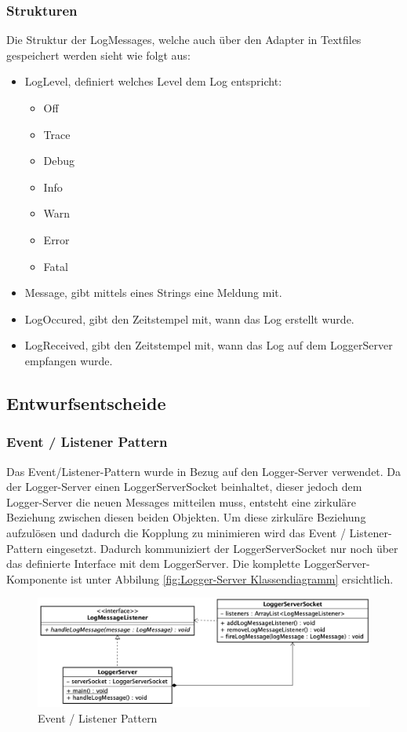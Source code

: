 \subsubsection{Strukturen}
Die Struktur der LogMessages, welche auch über den Adapter in Textfiles gespeichert werden sieht wie folgt aus:
\begin{itemize}
	\item LogLevel, definiert welches Level dem Log entspricht:
	\begin{itemize}
		\item Off
		\item Trace
		\item Debug
		\item Info
		\item Warn
		\item Error
		\item Fatal
	\end{itemize}
	\item Message, gibt mittels eines Strings eine Meldung mit.
	\item LogOccured, gibt den Zeitstempel mit, wann das Log erstellt wurde.
	\item LogReceived, gibt den Zeitstempel mit, wann das Log auf dem LoggerServer empfangen wurde.
\end{itemize}

\newpage
\subsection{Entwurfsentscheide}
\subsubsection{Event / Listener Pattern}
Das Event/Listener-Pattern wurde in Bezug auf den Logger-Server verwendet. Da der Logger-Server einen LoggerServerSocket beinhaltet, dieser jedoch dem Logger-Server die neuen Messages mitteilen muss, entsteht eine zirkuläre Beziehung zwischen diesen beiden Objekten. 
Um diese zirkuläre Beziehung aufzulösen und dadurch die Kopplung zu minimieren wird das Event / Listener-Pattern eingesetzt. Dadurch kommuniziert der LoggerServerSocket nur noch über das definierte Interface mit dem LoggerServer. Die komplette LoggerServer-Komponente ist unter Abbilung \ref{fig:Logger-Server Klassendiagramm} ersichtlich.
\begin{figure}[H]
	\centering
	\includegraphics[width=\textwidth]{2_Architektur/Bilder/loggerServer_EventListener.png}
	\caption{Event / Listener Pattern}
	\label{fig:Event / Listener Pattern}
\end{figure}

